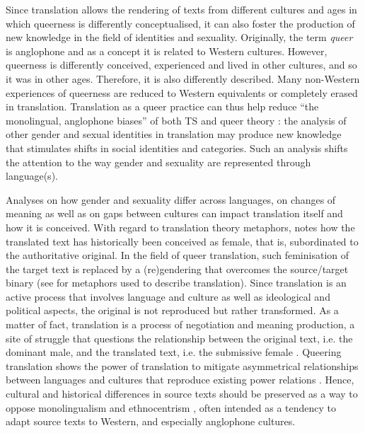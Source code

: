 Since translation allows the rendering of texts from different cultures and ages in which queerness is differently conceptualised, it can also foster the production of new knowledge in the field of identities and sexuality. Originally, the term \textit{queer} is anglophone and as a concept it is related to Western cultures. However, queerness is differently conceived, experienced and lived in other cultures, and so it was in other ages. Therefore, it is also differently described. Many non-Western experiences of queerness are reduced to Western equivalents or completely erased in translation. Translation as a queer practice can thus help reduce ``the monolingual, anglophone biases'' of both TS and queer theory \citep[299]{spurlin2014queering}: the analysis of other gender and sexual identities in translation may produce new knowledge that stimulates shifts in social identities and categories. Such an analysis shifts the attention to the way gender and sexuality are represented through language(s). 

Analyses on how gender and sexuality differ across languages, on changes of meaning as well as on gaps between cultures can impact translation itself and how it is conceived. With regard to translation theory metaphors, \textcite[301f]{spurlin2014queering} notes how the translated text has historically been conceived as female, that is, subordinated to the authoritative original. In the field of queer translation, such feminisation of the target text is replaced by a (re)gendering that overcomes the source/target binary (see \cite{chamberlain1988gender} for metaphors used to describe translation). Since translation is an active process that involves language and culture as well as ideological and political aspects, the original is not reproduced but rather transformed. As a matter of fact, translation is a process of negotiation and meaning production, a site of struggle that questions the relationship between the original text, i.e. the dominant male, and the translated text, i.e. the submissive female \citep[206]{spurlin2014gender}. Queering translation shows the power of translation to mitigate asymmetrical relationships between languages and cultures that reproduce existing power relations \citep[213]{spurlin2014gender}. Hence, cultural and historical differences in source texts should be preserved as a way to oppose monolingualism and ethnocentrism \citep{spurlin2014gender}, often intended as a tendency to adapt source texts to Western, and especially anglophone cultures.

